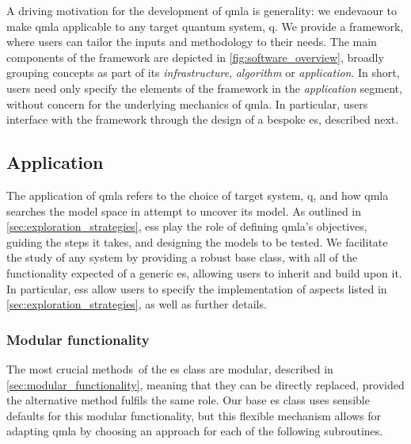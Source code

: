 A driving motivation for the development of \gls{qmla} is generality:
    we endevaour to make \gls{qmla} applicable to any target quantum system, \gls{q}.
We provide a framework, where users can tailor the inputs and methodology to their needs.
The main components of the framework are depicted in \cref{fig:software_overview}, 
    broadly grouping concepts as part of its \emph{infrastructure}, \emph{algorithm}
    or \emph{application}. 
In short, users need only specify the elements of the framework in the \emph{application} segment, 
    without concern for the underlying mechanics of \gls{qmla}.
In particular, users interface with the framework through the design of a bespoke \gls{es}, described next. 

\subsection{Application}\label{sec:application}
The application of \gls{qmla} refers to the choice of target system, \gls{q}, and how \gls{qmla} searches the 
     \gls{model space}  in attempt to uncover its model. 
As outlined in \cref{sec:exploration_strategies}, \glspl{es} play the role of 
    defining \gls{qmla}'s objectives, guiding the steps it takes, and designing the models to be tested. 
We facilitate the study of any system by providing a robust  base class,
    with all of the functionality expected of a generic \gls{es}, allowing users to inherit and build upon it. 
In particular, \glspl{es} allow users to specify the implementation of aspects listed in \cref{sec:exploration_strategies}, 
    as well as further details.
\par 


\subsubsection{Modular functionality}\label{sec:modular_functionality_sw}
The most crucial methods\footnotemark \ of the \gls{es} class are modular, 
    described in \cref{sec:modular_functionality},
    meaning that they can be directly replaced, provided the alternative method fulfils the same role. 
Our base \gls{es} class uses sensible defaults for this modular functionality, 
    but this flexible mechanism allows for adapting \gls{qmla} by choosing an approach for each 
    of the following subroutines. 

